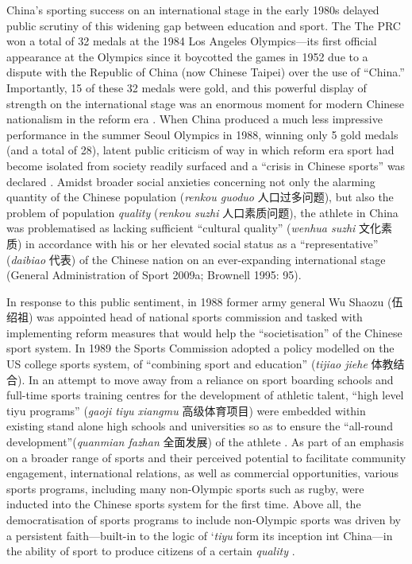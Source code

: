 {China's sporting success on an international stage in the early 1980s delayed public scrutiny of this widening gap between education and sport. The The PRC won a total of 32 medals at the 1984 Los Angeles Olympics---its first official appearance at the Olympics since it boycotted the games in 1952 due to a dispute with the Republic of China (now Chinese Taipei) over the use of ``China.''  Importantly, 15 of these 32 medals were gold, and this powerful display of strength on the international stage was an enormous moment for modern Chinese nationalism in the reform era \citep{Brownell2008}.  When China produced a much less impressive performance in the summer Seoul Olympics in 1988, winning only 5 gold medals (and a total of 28), latent public criticism of way in which reform era sport had become isolated from society readily surfaced and a ``crisis in Chinese sports'' was declared \citep[199]{Brownell1995}.  Amidst broader social anxieties concerning not only the alarming quantity of the Chinese population (\textit{renkou guoduo} 人口过多问题), but also the problem of population \textit{quality} (\textit{renkou suzhi} 人口素质问题), the athlete in China was problematised as lacking sufficient ``cultural quality'' (\textit{wenhua suzhi} 文化素质) in accordance with his or her elevated social status as a ``representative'' (\textit{daibiao} 代表) of the Chinese nation on an ever-expanding international stage (General Administration of Sport 2009a; Brownell 1995: 95).

In response to this public sentiment, in 1988 former army general Wu Shaozu (伍绍祖) was appointed head of national sports commission and tasked with implementing reform measures that would help the ``societisation'' of the Chinese sport system.  In 1989 the Sports Commission adopted a policy modelled on the US college sports system, of ``combining sport and education'' (\textit{tijiao jiehe} 体教结合).  In an attempt to move away from a reliance on sport boarding schools and full-time sports training centres for the development of athletic talent, ``high level tiyu programs'' (\textit{gaoji tiyu xiangmu} 高级体育项目) were embedded within existing stand alone high schools and universities so as to ensure the ``all-round development''(\textit{quanmian fazhan} 全面发展) of the athlete \citep[203]{Brownell1995}.  As part of an emphasis on a broader range of sports and their perceived potential to facilitate community engagement, international relations, as well as commercial opportunities, various sports programs, including many non-Olympic sports such as rugby, were inducted into the Chinese sports system for the first time\citep[70]{Knuttgen1990}.  Above all, the  democratisation of sports programs to include non-Olympic sports was driven by a persistent faith---built-in to the logic of `\textit{tiyu} form its inception int China---in the ability of sport to produce citizens of a certain \textit{quality} \citep[7]{Woronov2003}.

}
